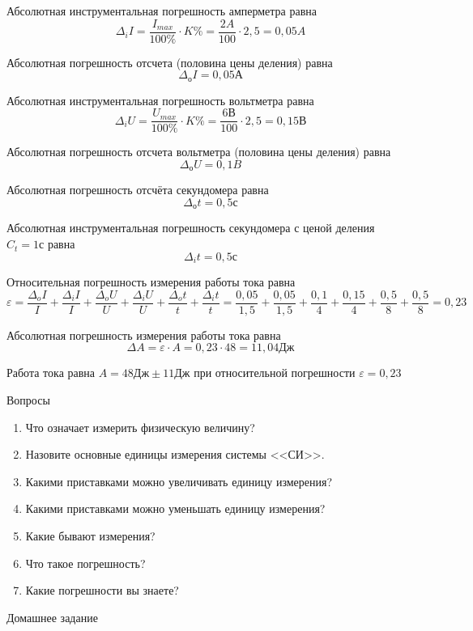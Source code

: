 \documentclass[a5paper, 10pt]{diss_4}
\renewcommand{\'}{\,'}
\begin{document}
Абсолютная инструментальная погрешность амперметра равна
\[\Delta_i I=\frac{I_{max}}{100\%}\cdot K\%=\frac{2A}{100}\cdot2,5=0,05A\]

Абсолютная погрешность отсчета (половина цены деления) равна
\[\Delta_о I = 0,05А \]

Абсолютная инструментальная погрешность вольтметра равна
\[\Delta_i U=\frac{U_{max}}{100\%}\cdot K\%=\frac{6В}{100}\cdot2,5=0,15В\]

Абсолютная погрешность отсчета вольтметра (половина цены деления) равна
\[\Delta_о U = 0,1B\]

Абсолютная погрешность отсчёта секундомера равна
\[\Delta_о t = 0,5с\]

Абсолютная  инструментальная погрешность  секундомера с ценой деления $C_t=1с$
равна
\[\Delta_i t = 0,5с\]

Относительная погрешность измерения работы тока равна
\[\varepsilon=\frac{\Delta_o I}{I}+\frac{\Delta_i I}{I}+\frac{\Delta_o U}{U}+
\frac{\Delta_i U}{U}+\frac{\Delta_o t}{t}+\frac{\Delta_i t}{t}=
\frac{0,05}{1,5}+\frac{0,05}{1,5}+\frac{0,1}{4}+\frac{0,15}{4}+
\frac{0,5}{8}+\frac{0,5}{8}=0,23\]

Абсолютная погрешность измерения работы тока равна
\[\Delta A=\varepsilon\cdot A=0,23\cdot48=11,04Дж\]

 Работа тока равна $A=48Дж\pm11Дж$ при относительной погрешности
$\varepsilon=0,23$

\begin{center}
Вопросы
\end{center}

\begin{enumerate}
\item Что означает измерить физическую величину?
\item Назовите основные единицы измерения системы <<СИ>>.
\item Какими приставками можно увеличивать единицу измерения?
\item Какими приставками можно уменьшать единицу измерения?
\item Какие бывают измерения?
\item Что такое погрешность?
\item Какие погрешности вы знаете?
\end{enumerate}

\begin{center}
Домашнее задание
\end{center}
\end{document}
